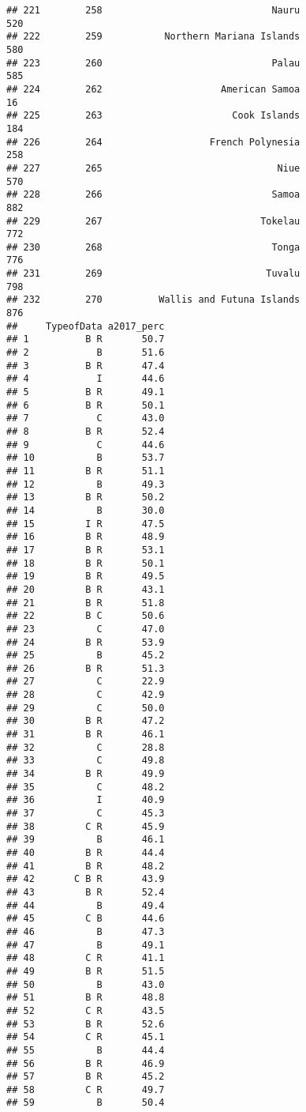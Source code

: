 \documentclass[]{article}
\begin{document}
\begin{verbatim}
## 221        258                              Nauru                520
## 222        259           Northern Mariana Islands                580
## 223        260                              Palau                585
## 224        262                     American Samoa                 16
## 225        263                       Cook Islands                184
## 226        264                   French Polynesia                258
## 227        265                               Niue                570
## 228        266                              Samoa                882
## 229        267                            Tokelau                772
## 230        268                              Tonga                776
## 231        269                             Tuvalu                798
## 232        270          Wallis and Futuna Islands                876
##     TypeofData a2017_perc
## 1          B R       50.7
## 2            B       51.6
## 3          B R       47.4
## 4            I       44.6
## 5          B R       49.1
## 6          B R       50.1
## 7            C       43.0
## 8          B R       52.4
## 9            C       44.6
## 10           B       53.7
## 11         B R       51.1
## 12           B       49.3
## 13         B R       50.2
## 14           B       30.0
## 15         I R       47.5
## 16         B R       48.9
## 17         B R       53.1
## 18         B R       50.1
## 19         B R       49.5
## 20         B R       43.1
## 21         B R       51.8
## 22         B C       50.6
## 23           C       47.0
## 24         B R       53.9
## 25           B       45.2
## 26         B R       51.3
## 27           C       22.9
## 28           C       42.9
## 29           C       50.0
## 30         B R       47.2
## 31         B R       46.1
## 32           C       28.8
## 33           C       49.8
## 34         B R       49.9
## 35           C       48.2
## 36           I       40.9
## 37           C       45.3
## 38         C R       45.9
## 39           B       46.1
## 40         B R       44.4
## 41         B R       48.2
## 42       C B R       43.9
## 43         B R       52.4
## 44           B       49.4
## 45         C B       44.6
## 46           B       47.3
## 47           B       49.1
## 48         C R       41.1
## 49         B R       51.5
## 50           B       43.0
## 51         B R       48.8
## 52         C R       43.5
## 53         B R       52.6
## 54         C R       45.1
## 55           B       44.4
## 56         B R       46.9
## 57         B R       45.2
## 58         C R       49.7
## 59           B       50.4

\end{verbatim}
\end{document}
